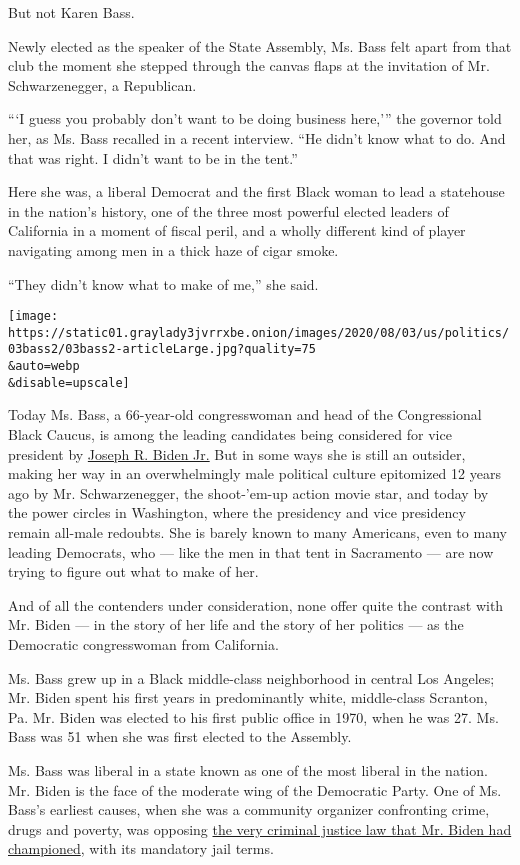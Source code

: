 But not Karen Bass.

Newly elected as the speaker of the State Assembly, Ms. Bass felt apart
from that club the moment she stepped through the canvas flaps at the
invitation of Mr. Schwarzenegger, a Republican.

```I guess you probably don't want to be doing business here,''' the
governor told her, as Ms. Bass recalled in a recent interview. ``He
didn't know what to do. And that was right. I didn't want to be in the
tent.''

Here she was, a liberal Democrat and the first Black woman to lead a
statehouse in the nation's history, one of the three most powerful
elected leaders of California in a moment of fiscal peril, and a wholly
different kind of player navigating among men in a thick haze of cigar
smoke.

``They didn't know what to make of me,'' she said.

\texttt{[image: https://static01.graylady3jvrrxbe.onion/images/2020/08/03/us/politics/03bass2/03bass2-articleLarge.jpg?quality=75\\\&auto=webp\\\&disable=upscale]}

Today Ms. Bass, a 66-year-old congresswoman and head of the
Congressional Black Caucus, is among the leading candidates being
considered for vice president by
\href{https://www.nytimes3xbfgragh.onion/interactive/2020/us/elections/joe-biden.html}{Joseph
R. Biden Jr.} But in some ways she is still an outsider, making her way
in an overwhelmingly male political culture epitomized 12 years ago by
Mr. Schwarzenegger, the shoot-'em-up action movie star, and today by the
power circles in Washington, where the presidency and vice presidency
remain all-male redoubts. She is barely known to many Americans, even to
many leading Democrats, who --- like the men in that tent in Sacramento
--- are now trying to figure out what to make of her.

And of all the contenders under consideration, none offer quite the
contrast with Mr. Biden --- in the story of her life and the story of
her politics --- as the Democratic congresswoman from California.

Ms. Bass grew up in a Black middle-class neighborhood in central Los
Angeles; Mr. Biden spent his first years in predominantly white,
middle-class Scranton, Pa. Mr. Biden was elected to his first public
office in 1970, when he was 27. Ms. Bass was 51 when she was first
elected to the Assembly.

Ms. Bass was liberal in a state known as one of the most liberal in the
nation. Mr. Biden is the face of the moderate wing of the Democratic
Party. One of Ms. Bass's earliest causes, when she was a community
organizer confronting crime, drugs and poverty, was opposing
\href{https://www.nytimes3xbfgragh.onion/2019/06/25/us/joe-biden-crime-laws.html}{the
very criminal justice law that Mr. Biden had championed}, with its
mandatory jail terms.

